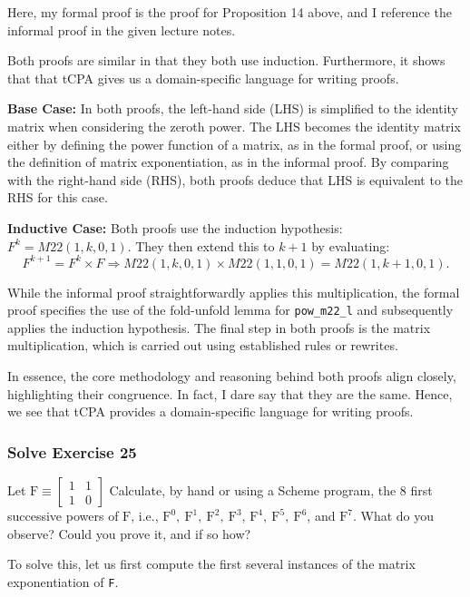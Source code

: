 \documentclass{article}
\begin{document}
Here, my formal proof is the proof for Proposition 14 above, and I reference the informal proof in the given lecture notes.

Both proofs are similar in that they both use induction. Furthermore, it shows that that tCPA gives us a domain-specific language for writing proofs.

\textbf{Base Case:} 
In both proofs, the left-hand side (LHS) is simplified to the identity matrix when considering the zeroth power. The LHS becomes the identity matrix either by defining the power function of a matrix, as in the formal proof, or using the definition of matrix exponentiation, as in the informal proof. By comparing with the right-hand side (RHS), both proofs deduce that LHS is equivalent to the RHS for this case.

\textbf{Inductive Case:}
Both proofs use the induction hypothesis: $F^k = M22(1, k, 0, 1)$. They then extend this to $k + 1$ by evaluating:
\[ F^{k+1} = F^k \times F \Rightarrow M22(1, k, 0, 1) \times M22(1, 1, 0, 1) = M22(1, k + 1, 0, 1). \]

While the informal proof straightforwardly applies this multiplication, the formal proof specifies the use of the fold-unfold lemma for \texttt{pow\_m22\_l} and subsequently applies the induction hypothesis. The final step in both proofs is the matrix multiplication, which is carried out using established rules or rewrites.

In essence, the core methodology and reasoning behind both proofs align closely, highlighting their congruence. In fact, I dare say that they are the same. Hence, we see that tCPA provides a domain-specific language for writing proofs.

\subsubsection{Solve Exercise 25}

Let $\mathrm{F} \equiv\left[\begin{array}{ll}1 & 1 \\ 1 & 0\end{array}\right]$
Calculate, by hand or using a Scheme program, the 8 first successive powers of $\mathrm{F}$, i.e., $\mathrm{F}^0, \mathrm{~F}^1, \mathrm{~F}^2, \mathrm{~F}^3$, $\mathrm{F}^4, \mathrm{~F}^5, \mathrm{~F}^6$, and $\mathrm{F}^7$. What do you observe? Could you prove it, and if so how?

To solve this, let us first compute the first several instances of the matrix exponentiation of \texttt{F}.
\end{document}
